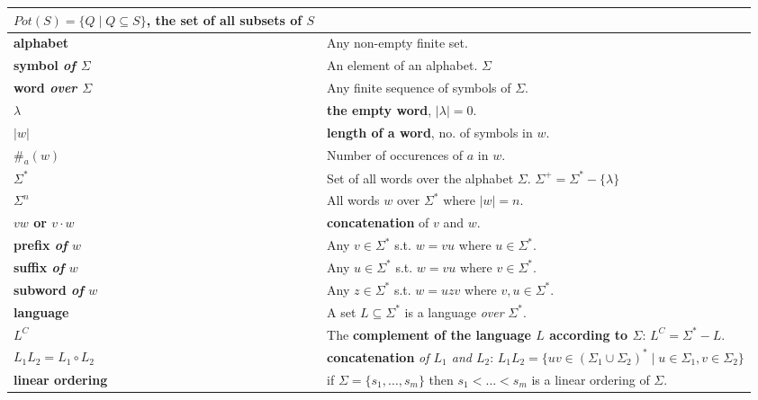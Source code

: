 \setlength{\tabcolsep}{6pt}
\begin{tabu} to 
  {\centering $Pot(S) = \{Q \mid Q \subseteq S\}$, the set of all subsets of $S$} \\ \hline
  alphabet \norm{($\Sigma$)} & Any non-empty finite set.\\ \hline
  symbol {\it of $\Sigma$} & An element of an alphabet.
  $\Sigma$\\ \hline
  word {\it over $\Sigma$} & Any finite sequence of symbols of $\Sigma$.
  \\ \hline
  $\lambda$ & {\bf the empty word}, $|\lambda| = 0$. \\ \hline
  $| w |$ & {\bf length of a word}, no. of symbols in $w$. \\ \hline
  $\#_a(w)$ & Number of occurences of $a$ in $w$. \\ \hline
  $\Sigma^*$ & Set of all words over the alphabet $\Sigma$. \newline
  $\Sigma^+ = \Sigma^* - \{\lambda\}$ \\ \hline
  $\Sigma^n$ & All words $w$ over $\Sigma^*$ where $| w | = n$.
  \\ \hline
  $vw$ or $v \cdot w$ & {\bf concatenation} of $v$ and $w$. \\ \hline
  prefix {\it of} $w$ & Any $v \in \Sigma^*$ s.t. $w = vu$ where $u \in \Sigma^*$.
  \\ \hline
  suffix {\it of} $w$ & Any $u \in \Sigma^*$ s.t. $w = vu$ where $v \in \Sigma^*$.
  \\ \hline
  subword {\it of} $w$ & Any $z \in \Sigma^*$ s.t. $w = uzv$ where  $v, u \in
  \Sigma^*$. \\ \hline
  language  & A set $L \subseteq \Sigma^*$ is a language {\it over}
  $\Sigma^*$. \\ \hline
  $L^C$ & The {\bf complement of the language $L$ according to $\Sigma$}:
  $L^C = \Sigma^* - L$. \\ \hline
  $L_1L_2 = L_1 \circ L_2$ & {\bf concatenation} {\it of $L_1$ and $L_2$}: \newline
  $L_1L_2 = \{uv \in \left(\Sigma_1 \cup \Sigma_2 \right)^* \mid u \in \Sigma_1,
  v \in \Sigma_2\}$ \\ \hline
  linear \newline ordering & if $\Sigma = \{s_1, \ldots, s_m\}$ then
  $s_1 < \ldots < s_m$ is a linear ordering of $\Sigma$. \\ \hline

\end{tabu}
